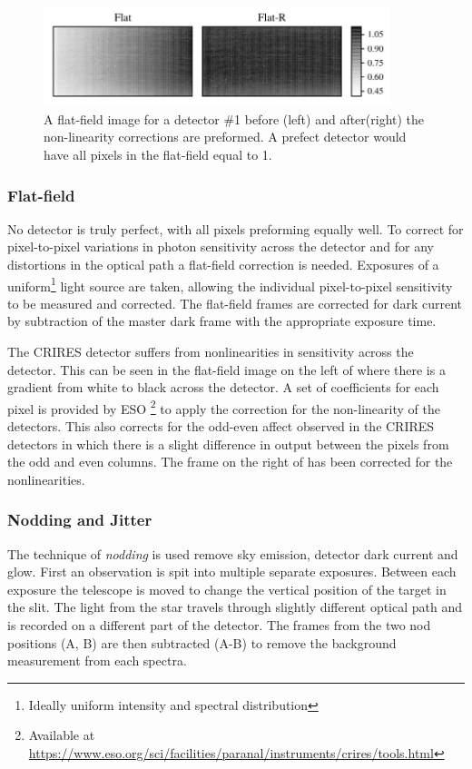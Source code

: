 \begin{figure}[h]
    \centering
    \includegraphics[width=0.9\textwidth]{figures/reduction/master_flats_1.pdf}
    \caption{A flat-field image for a detector \#1 before (left) and after(right) the non-linearity corrections are preformed. A prefect detector would have all pixels in the flat-field equal to 1.}
    \label{fig:masterflats}
\end{figure}

\subsubsection{Flat-field}
No detector is truly perfect, with all pixels preforming equally well. To correct for pixel-to-pixel variations in photon sensitivity across the detector and for any distortions in the optical path a flat-field correction is needed. Exposures of a uniform\footnote{Ideally uniform intensity and spectral distribution} light source are taken, allowing the individual pixel-to-pixel sensitivity to be measured and corrected. The flat-field frames are corrected for dark current by subtraction of the master dark frame with the appropriate exposure time.

The CRIRES detector suffers from nonlinearities in sensitivity across the detector. This can be seen in the flat-field image on the left of  where there is a gradient from white to black across the detector. A set of coefficients for each pixel is provided by ESO \footnote{Available at \href{https://www.eso.org/sci/facilities/paranal/instruments/crires/tools.html}{https://www.eso.org/sci/facilities/paranal/instruments/crires/tools.html}} to apply the correction for the non-linearity of the detectors. This also corrects for the odd-even affect observed in the CRIRES detectors in which there is a slight difference in output between the pixels from the odd and even columns. The frame on the right of  has been corrected for the nonlinearities.



\subsubsection{Nodding and Jitter}
The technique of \emph{nodding} is used remove sky emission, detector dark current and glow. First an observation is spit into multiple separate exposures. Between each exposure the telescope is moved to change the vertical position of the target  in the slit. The light from the star travels through slightly different optical path and is recorded on a different part of the detector. The frames from the two nod positions (A, B) are then subtracted (A-B) to remove the background measurement from each spectra.

